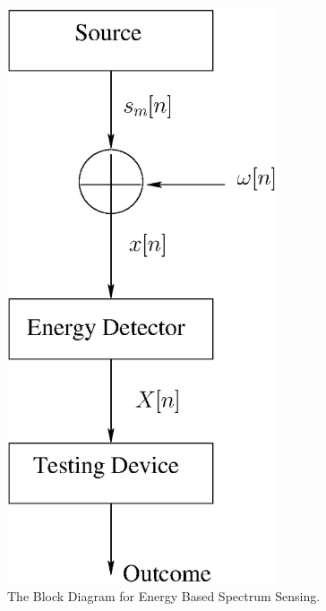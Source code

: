 \documentclass[12pt,journal,a4paper,twoside,onecolumn,draft]{IEEEtran}
\begin{document}
\begin{spacing}{2.5}
\begin{figure}[!t]
\centering
\includegraphics[width=8cm]{fig1.eps}
\caption{The Block Diagram for Energy Based Spectrum Sensing.}
\label{pic: block diagram}
\end{figure}


\end{spacing}
\end{document}
